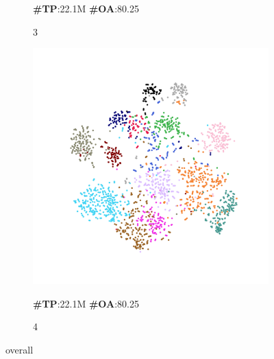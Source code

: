 \begin{figure}
\begin{subfigure}{0.24\textwidth}
        \caption*{\textbf{\#TP}:22.1M \textbf{\#OA}:80.25}
        \caption{3}
        \label{fig:sub3}
    \end{subfigure}
    \hfill
    \begin{subfigure}{0.24\textwidth}
        \centering
        \includegraphics[width=0.5\linewidth]{fig/tsne/point_ladder1.pdf}
        \caption*{\textbf{\#TP}:22.1M \textbf{\#OA}:80.25}
        \caption{4}
        \label{fig:sub4}
    \end{subfigure}
    \caption{overall}
    \label{fig:whole}
\end{figure}